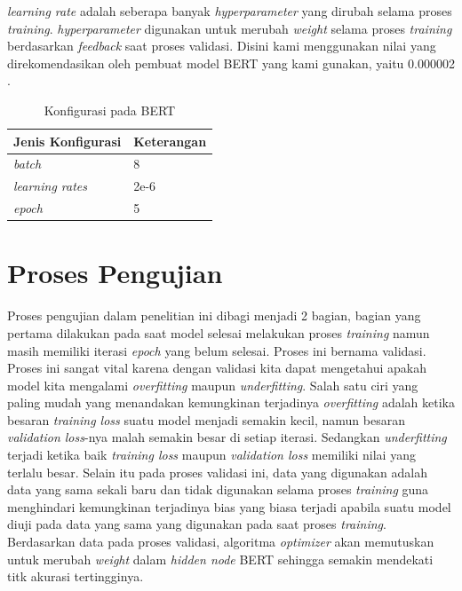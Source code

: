 \textit{learning rate} adalah seberapa banyak \textit{hyperparameter} yang dirubah selama proses \textit{training}. \textit{hyperparameter} digunakan untuk merubah \textit{weight} selama proses \textit{training} berdasarkan \textit{feedback} saat proses validasi. Disini kami menggunakan nilai yang direkomendasikan oleh pembuat model BERT yang kami gunakan, yaitu 0.000002 \cite{koto2020indolem}.

\begin{table}
  \caption{Konfigurasi pada BERT}
  \label{tab:bert_config}
  \centering
  \begin{tabular}{ | l | l | }
    \hline
    \textbf{Jenis Konfigurasi} & \textbf{Keterangan} \\ \hline
    \textit{batch}             & 8                   \\ \hline
    \textit{learning rates}    & 2e-6                \\ \hline
    \textit{epoch}             & 5                   \\ \hline
  \end{tabular}
\end{table}


\section{Proses Pengujian}

Proses pengujian dalam penelitian ini dibagi menjadi 2 bagian, bagian yang pertama dilakukan pada saat model selesai melakukan proses \textit{training} namun masih memiliki iterasi \textit{epoch} yang belum selesai. Proses ini bernama validasi. Proses ini sangat vital karena dengan validasi kita dapat mengetahui apakah model kita mengalami \textit{overfitting} maupun \textit{underfitting}. Salah satu ciri yang paling mudah yang menandakan kemungkinan terjadinya \textit{overfitting} adalah ketika besaran \textit{training loss} suatu model menjadi semakin kecil, namun besaran \textit{validation loss}-nya malah semakin besar di setiap iterasi. Sedangkan \textit{underfitting} terjadi ketika baik \textit{training loss} maupun \textit{validation loss} memiliki nilai yang terlalu besar. Selain itu pada proses validasi ini, data yang digunakan adalah data yang sama sekali baru dan tidak digunakan selama proses \textit{training} guna menghindari kemungkinan terjadinya bias yang biasa terjadi apabila suatu model diuji pada data yang sama yang digunakan pada saat proses \textit{training}. Berdasarkan data pada proses validasi, algoritma \textit{optimizer} akan memutuskan untuk merubah \textit{weight} dalam \textit{hidden node} BERT sehingga semakin mendekati titk akurasi tertingginya.


